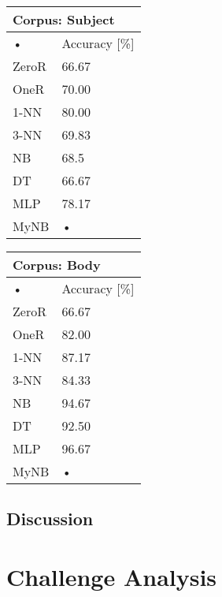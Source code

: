 \documentclass[10pt, a4paper]{article}
\begin{document}
\begin{tabular}{|l|l|}
\hline
\multicolumn{2}{|l|}{Corpus: Subject} \\
\hline
• & Accuracy [\%] \\
\hline
ZeroR & 66.67 \\
\hline
OneR & 70.00 \\
\hline
1-NN & 80.00 \\
\hline
3-NN & 69.83 \\
\hline
NB & 68.5 \\
\hline
DT & 66.67 \\
\hline
MLP & 78.17 \\
\hline
MyNB & • \\
\hline
\end{tabular}

\begin{tabular}{|l|l|}
\hline
\multicolumn{2}{|l|}{Corpus: Body} \\
\hline
• & Accuracy [\%] \\
\hline
ZeroR & 66.67 \\
\hline
OneR & 82.00 \\
\hline
1-NN & 87.17 \\
\hline
3-NN & 84.33 \\
\hline
NB & 94.67 \\
\hline
DT & 92.50 \\
\hline
MLP & 96.67 \\
\hline
MyNB & • \\
\hline
\end{tabular}

\subsection{Discussion}


\section{Challenge Analysis}

\end{document}
